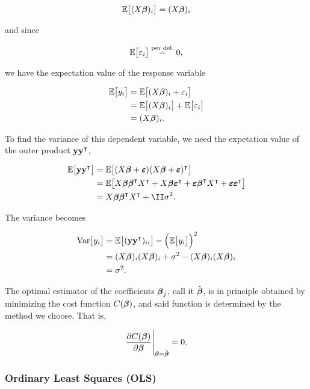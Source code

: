 \begin{align*}
    \mathbb{E}\big[(X\boldsymbol{\beta})_{i}\big] = (X\boldsymbol{\beta})_{i}
\end{align*}

and since 

\begin{align*}
    \mathbb{E}\big[\varepsilon_i\big] \stackrel{\text{per def.}}{=} 0,
\end{align*}

we have the expectation value of the response variable

\begin{align*}
    \mathbb{E}\big[y_i\big] &= \mathbb{E}\big[(X\boldsymbol{\beta})_{i}+ \varepsilon_i\big] \\
    &= \mathbb{E}\big[(X\boldsymbol{\beta})_{i}\big] + \mathbb{E}\big[\varepsilon_i\big] \\
    &= (X\boldsymbol{\beta})_{i}.
\end{align*}

To find the variance of this dependent variable, we need the expetation value of the outer product $\mathbf{y}\mathbf{y}^\intercal$,

\begin{align}
    \EE{\vec{y} \vec{y}\TT} &= \EE{(X\svec{\beta} + \svec{\epsilon})(X\svec{\beta} + \svec{\epsilon})\TT} \nonumber\\
    &= \EE{\Xb \svec{\beta}\TT X\TT + \Xb \svec{\epsilon}\TT + \svec{\epsilon}\svec{\beta}\TT X\TT + \svec{\epsilon} \svec{\epsilon}\TT} \nonumber \\
    &= \Xb \svec{\beta}\TT X\TT + \II \sigma^2. \label{eq:expectation_yyT}
\end{align}

The variance becomes

\begin{align*}
    \text{Var}\big[y_i\big] &= \mathbb{E}\big[(\mathbf{y}\mathbf{y}^\intercal)_{ii}\big] -\Big(\mathbb{E}\big[y_i\big]\Big)^2\\
    &= (X\boldsymbol{\beta})_{i} (X\boldsymbol{\beta})_{i} + \sigma^2 - (X\boldsymbol{\beta})_{i} (X\boldsymbol{\beta})_{i}\\
    &= \sigma^2.
\end{align*}


The optimal estimator of the coefficients $\boldsymbol{\beta}_j$, call it $\hat{\boldsymbol{\beta}}$, is in principle obtained by minimizing the cost function $C(\boldsymbol{\beta})$, and said function is determined by the method we choose. That is,

\begin{align}\label{eq:general_LS}
    \pdv{C(\boldsymbol{\beta})}{\boldsymbol{\beta}}\Bigg|_{\boldsymbol{\beta}=\hat{\boldsymbol{\beta}}} = 0.
\end{align}

\subsubsection{Ordinary Least Squares (OLS)}\label{sec:OLS}

